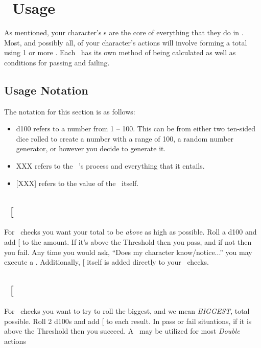 \section{\attribute\ Usage}\label{sec:attr_usage}
As mentioned, your character's \attribute s are the core of everything that they do in \gametitle. Most, and possibly all, of your character's actions will involve forming a total using 1 or more \attribute . Each \attribute\ has its own method of being calculated as well as conditions for passing and failing. 

\subsection*{Usage Notation}\label{subsec:notation}
The notation for this section is as follows:
\begin{itemize}
	\item d100 refers to a number from 1 -- 100. This can be from either two ten-sided dice rolled to create a number with a range of 100, a random number generator, or however you decide to generate it.
	\item XXX refers to the \attribute\ 's process and everything that it entails.
	\item {[}XXX{]} refers to the value of the \attribute\ itself.
\end{itemize}
\clearpage

\subsection{\KNOWful\ {[}\KNOW\index{\attribute!\KNOWful}{]}}\label{subsec:kno}
\noindent For \KNOWful\ checks you want your total to be \textit{above} as high as possible.
\noindent Roll a d100 and add {[}\KNOW{]} to the amount. If it's above the Threshold then you pass, and if not then you fail.
\fillrlinemid
\noindent Any time you would ask, ``Does my character know/notice...'' you may execute a \KNOW. 
Additionally, {[}\KNOW{]} itself is added directly to your \skill\ checks.

\clearpage
\subsection{\POWEful\ {[}\POWE\index{\attribute!\POWEful}{]}}\label{subsec:pow}
\noindent For \POWEful\ checks you want to try to roll the biggest, and we mean \emph{BIGGEST}, total possible.
\noindent Roll 2 d100s and add {[}\POWE{]} to each result. In pass or fail situations, if it is above the Threshold then you succeed.
\fillrlinemid
\noindent A \POWE\ may be utilized for most \emph{Double} actions

